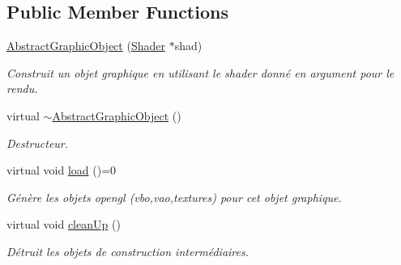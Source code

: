 \subsection*{Public Member Functions}
\begin{DoxyCompactItemize}
\item 
\hypertarget{classAbstractGraphicObject_ab1ddb96b82b01bba5e56e0917dceba0c}{\hyperlink{classAbstractGraphicObject_ab1ddb96b82b01bba5e56e0917dceba0c}{Abstract\+Graphic\+Object} (\hyperlink{classShader}{Shader} $\ast$shad)}\label{classAbstractGraphicObject_ab1ddb96b82b01bba5e56e0917dceba0c}

\begin{DoxyCompactList}\small\item\em Construit un objet graphique en utilisant le shader donné en argument pour le rendu. \end{DoxyCompactList}\item 
\hypertarget{classAbstractGraphicObject_aa20078bf878fc72814a44d5a986ec548}{virtual \hyperlink{classAbstractGraphicObject_aa20078bf878fc72814a44d5a986ec548}{$\sim$\+Abstract\+Graphic\+Object} ()}\label{classAbstractGraphicObject_aa20078bf878fc72814a44d5a986ec548}

\begin{DoxyCompactList}\small\item\em Destructeur. \end{DoxyCompactList}\item 
\hypertarget{classAbstractGraphicObject_ae0e201a972ea7e97b032bf21f75390a7}{virtual void \hyperlink{classAbstractGraphicObject_ae0e201a972ea7e97b032bf21f75390a7}{load} ()=0}\label{classAbstractGraphicObject_ae0e201a972ea7e97b032bf21f75390a7}

\begin{DoxyCompactList}\small\item\em Génère les objets opengl (vbo,vao,textures) pour cet objet graphique. \end{DoxyCompactList}\item 
\hypertarget{classAbstractGraphicObject_a69f33de948f6a754f6c345e5ad439e89}{virtual void \hyperlink{classAbstractGraphicObject_a69f33de948f6a754f6c345e5ad439e89}{clean\+Up} ()}\label{classAbstractGraphicObject_a69f33de948f6a754f6c345e5ad439e89}

\begin{DoxyCompactList}\small\item\em Détruit les objets de construction intermédiaires. \end{DoxyCompactList}\end{DoxyCompactItemize}
